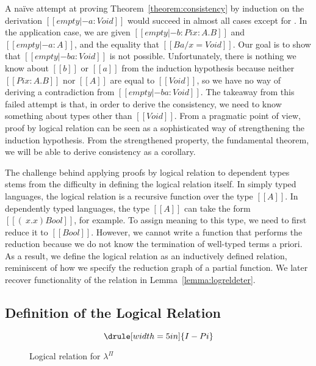 \documentclass[\ifpublic nolinenum\else\fi,online,OA]{jfp}
\newcommand{\jc}[1]{}
\newcommand{\lang}{$\lambda^{\Pi}$\xspace}
\theoremstyle{definition}
\begin{document}
A na\"ive attempt at proving Theorem~\ref{theorem:consistency} by
induction on the derivation $[[empty |- a : Void]]$ would succeed in
almost all cases except for . In the application
case, we are given $[[empty |- b : Pi x : A . B]]$ and $[[empty |- a : A]]$, and
the equality that $[[B {a / x} = Void]]$. Our goal is to show that
$[[empty |- b a : Void]]$ is not possible. Unfortunately, there is
nothing we know about $[[b]]$ or $[[a]]$ from the induction hypothesis
because neither $[[Pi x : A . B]]$ nor $[[A]]$ are equal to $[[Void]]$,
so we have no way of deriving a contradiction from $[[empty |- b a :
Void]]$. The takeaway from this failed attempt is that, in order to
derive the consistency, we need to know something about types other
than $[[Void]]$. From a pragmatic point of view, proof by logical
relation can be seen as a sophisticated way of strengthening the
induction hypothesis. From the strengthened property, the fundamental
theorem, we will be able to derive consistency as a corollary.

\jc{Minor comment but ``proof by logical relation'' sounds grammatically strange to me,
but I'm not sure whether ``proof by logical relations'' or
``proof by a logical relation'' would be any more correct...}

The challenge behind applying proofs by logical relation to dependent types
stems from the difficulty in defining the logical relation itself. In simply
typed languages, the logical relation is a recursive function over the type
$[[A]]$. In dependently typed languages, the type $[[A]]$ can take the form
$[[(\ x . x ) Bool]]$, for example. To assign meaning to this type, we need to
first reduce it to $[[Bool]]$. However, we cannot write a function that
performs the reduction because we do not know the termination of well-typed
terms a priori. As a result, we define the logical relation as an inductively
defined relation, reminiscent of how we specify the reduction graph of a
partial function.
We later recover functionality of the relation in Lemma~\ref{lemma:logreldeter}.

\subsection{Definition of the Logical Relation}

\begin{figure}
\[ \drule[width=5in]{I-Pi} \]
\caption{Logical relation for \lang{}}
\label{fig:logrel}
\end{figure}
\end{document}
